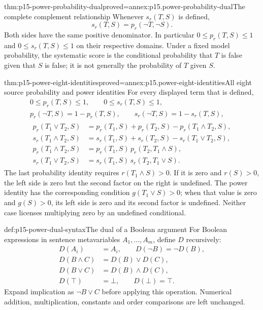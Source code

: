\begin{hbtheorem}{thm:p15-power-probability-dual}{proved=annex:p15.power-probability-dual}{The complete complement relationship}
Whenever \(s_r(T,S)\) is defined,
\[
                    s_r(T,S)=p_r(\neg T,\neg S).
\]
Both sides have the same positive denominator.
In particular \(0\le p_r(T,S)\le1\) and
\(0\le s_r(T,S)\le1\) on their respective
domains. Under a fixed model probability,
the systematic score is the conditional
probability that \(T\) is false given that
\(S\) is false; it is not generally
the probability of \(T\) given \(S\).
\end{hbtheorem}

\begin{hbtheorem}{thm:p15-power-eight-identities}{proved=annex:p15.power-eight-identities}{All eight source probability and power identities}
For every displayed term that is defined,
\[
\begin{gathered}
 0\le p_r(T,S)\le1,\qquad 0\le s_r(T,S)\le1,\\
 p_r(\neg T,S)=1-p_r(T,S),\qquad
 s_r(\neg T,S)=1-s_r(T,S),\\[2pt]
 \begin{aligned}
 p_r(T_1\lor T_2,S)&=
 p_r(T_1,S)+p_r(T_2,S)-p_r(T_1\land T_2,S),\\
 s_r(T_1\land T_2,S)&=
 s_r(T_1,S)+s_r(T_2,S)-s_r(T_1\lor T_2,S),\\
 p_r(T_1\land T_2,S)&=p_r(T_1,S)\,p_r(T_2,T_1\land S),\\
 s_r(T_1\lor T_2,S)&=s_r(T_1,S)\,s_r(T_2,T_1\lor S).
 \end{aligned}
\end{gathered}
\]
The last probability identity requires
\(r(T_1\land S)>0\). If it is zero and
\(r(S)>0\), the left side is zero but
the second factor on the right is undefined.
The power identity has the corresponding
condition \(g(T_1\lor S)>0\); when that
value is zero and \(g(S)>0\), its left
side is zero and its second factor is
undefined. Neither case licenses multiplying
zero by an undefined conditional.
\end{hbtheorem}

\begin{hbdefinition}{def:p15-power-dual-syntax}{The dual of a Boolean argument}
For Boolean expressions in sentence metavariables
\(A_1,\ldots,A_m\), define \(D\) recursively:
\[
\begin{aligned}
 D(A_i)&=A_i,\qquad D(\neg B)=\neg D(B),\\
 D(B\land C)&=D(B)\lor D(C),\\
 D(B\lor C)&=D(B)\land D(C),\\
 D(\top)&=\bot,\qquad D(\bot)=\top.
\end{aligned}
\]
Expand implication as \(\neg B\lor C\)
before applying this operation.
Numerical addition, multiplication, constants
and order comparisons are left unchanged.
\end{hbdefinition}

